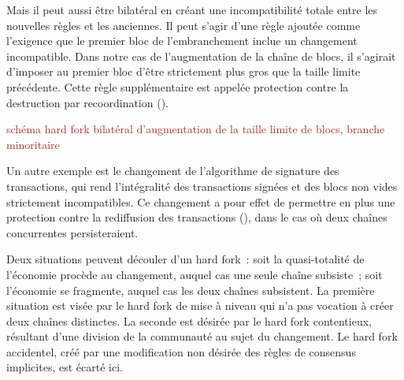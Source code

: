 Mais il peut aussi être bilatéral en créant une incompatibilité totale entre les nouvelles règles et les anciennes. Il peut s'agir d'une règle ajoutée comme l'exigence que le premier bloc de l'embranchement inclue un changement incompatible. Dans notre cas de l'augmentation de la chaîne de blocs, il s'agirait d'imposer au premier bloc d'être strictement plus gros que la taille limite précédente. Cette règle supplémentaire est appelée protection contre la destruction par recoordination ().

\textcolor{brown}{schéma hard fork bilatéral d'augmentation de la taille limite de blocs, branche minoritaire}

Un autre exemple est le changement de l'algorithme de signature des transactions, qui rend l'intégralité des transactions signées et des blocs non vides strictement incompatibles. Ce changement a pour effet de permettre en plus une protection contre la rediffusion des transactions (), dans le cas où deux chaînes concurrentes persisteraient.

Deux situations peuvent découler d'un hard fork~: soit la quasi-totalité de l'économie procède au changement, auquel cas une seule chaîne subsiste~; soit l'économie se fragmente, auquel cas les deux chaînes subsistent. La première situation est visée par le hard fork de mise à niveau qui n'a pas vocation à créer deux chaînes distinctes. La seconde est désirée par le hard fork contentieux, résultant d'une division de la communauté au sujet du changement. Le hard fork accidentel, créé par une modification non désirée des règles de consensus implicites, est écarté ici.


